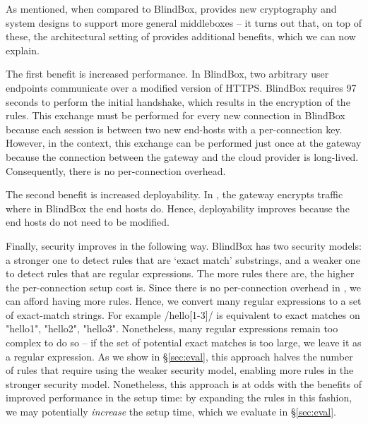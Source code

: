 As mentioned, when compared to BlindBox, \sys provides new cryptography and system designs to support  more general middleboxes --  it turns out that, on top of these, the architectural setting of \sys provides additional benefits, which we can now explain.


%
The first benefit is increased performance. In BlindBox, two arbitrary user endpoints communicate over a modified version of HTTPS. BlindBox requires 97 seconds to perform the initial handshake, which results in the encryption of the rules. 
This exchange must be performed for every new connection in BlindBox because each session is between two new end-hosts with a per-connection key.
However, in the \sys context, this exchange can be performed just once at the gateway because the connection between the gateway and the cloud provider is long-lived. Consequently, there is no per-connection overhead. 


The second benefit is increased deployability. In \sys, the gateway encrypts traffic where in BlindBox the end hosts do. Hence, deployability improves because the end hosts do not need to be modified.

Finally, security improves in the following way.
BlindBox has two security models: a stronger one to detect rules that are `exact match' substrings, and a weaker one to detect rules that are regular expressions. The more rules there are, the higher the per-connection setup cost is. 
Since there is no per-connection overhead  in \sys, we can afford having more rules. 
Hence, we convert many regular expressions to a set of exact-match strings. 
For example /hello[1-3]/ is equivalent to exact matches on "hello1", "hello2", "hello3".
Nonetheless, many regular expressions remain too complex to do so -- if the set of potential exact matches is too large, we leave it as a regular expression.
As we show in \S\ref{sec:eval}, this approach halves the number of rules that require using the weaker security model, enabling more rules in the stronger security model. 
Nonetheless, this approach is at odds with the benefits of improved performance in the setup time: by expanding the rules in this fashion, we may potentially {\it increase} the setup time, which we evaluate in \S\ref{sec:eval}.

